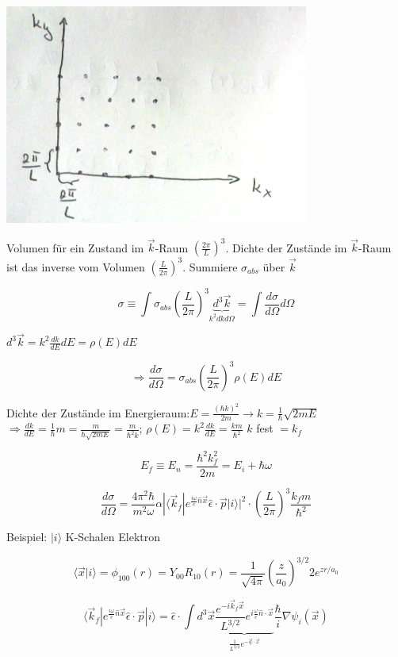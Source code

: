 \includegraphics[width=0.75\textwidth]{kap03_11.png}



Volumen für ein Zustand im \(\vec k\)-Raum \(\left( \frac{2\pi}{L}\right)^3\). Dichte der Zustände im \(\vec k\)-Raum ist das inverse vom Volumen \(\left( \frac{L}{2\pi}\right)^3\). Summiere \(\sigma_{abs}\) über \(\vec k\)

\[\sigma \equiv \int \sigma_{abs} \left( \frac{L}{2\pi}\right)^3 \underbrace{d^3\vec k}_{k^2 dkd\Omega} = \int \frac{d\sigma}{d\Omega}d\Omega\]

\(d^3\vec k = k^2\frac{dk}{dE}dE = \rho(E)dE\)

\[\Rightarrow \frac{d\sigma}{d\Omega} = \sigma_{abs} \left( \frac{L}{2\pi}\right)^3\rho(E)dE\]

Dichte der Zustände im Energieraum:\(E=\frac{(\hbar k)^2}{2m} \rightarrow k=\frac{1}{\hbar}\sqrt{2mE}\) \(\Rightarrow \frac{dk}{dE} = \frac{1}{\hbar}m=\frac{m}{\hbar \sqrt{2mE}}=\frac{m}{\hbar^2k}\); \(\rho(E) = k^2 \frac{dk}{dE} = \frac{km}{\hbar^2}\) \(k\) fest \(=k_f\)

\[E_f\equiv E_n = \frac{\hbar^2k_f^2}{2m} = E_i +\hbar\omega\]

\[\frac{d\sigma}{d\Omega} = \frac{4\pi^2\hbar}{m^2\omega}\alpha  |\langle \vec k_f|e^{\frac{i\omega}{c}\hat n\vec x}\hat \epsilon\cdot\vec p|i\rangle|^2\cdot \left( \frac{L}{2\pi}\right)^3 \frac{k_f m}{\hbar^2}\]

Beispiel: \(|i\rangle\) K-Schalen Elektron

\[\langle \vec x|i\rangle =\phi_{100}(r) = Y_{00}R_{10}(r) = \frac{1}{\sqrt{4\pi}}\left( \frac{z}{a_0} \right)^{3/2} 2 e^{zr/a_0}\]



\[\langle \vec k_f|e^{\frac{i\omega}{c}\hat n\vec x}\hat \epsilon\cdot\vec p|i\rangle = \hat\epsilon\cdot\int d^3\vec x \underbrace{\frac{e^{-i\vec k_f\vec x}}{L^{3/2}}e^{i\frac{\omega}{c}\hat n\cdot\vec x}}_{\frac{1}{L^{3/2}}e^{-\vec q\cdot \vec x}}\frac{\hbar}{i}\nabla \psi_i(\vec x)\]

